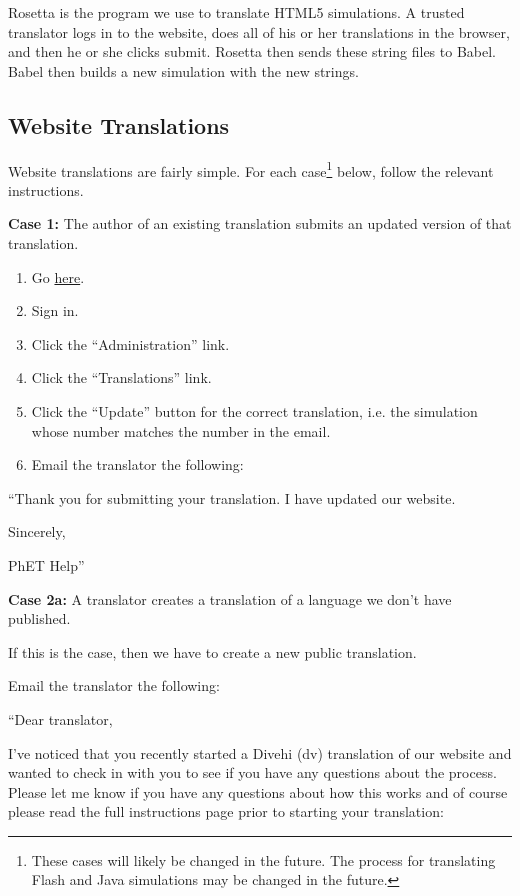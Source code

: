 \documentclass[titlepage]{article}
\begin{document}
Rosetta is the program we use to translate HTML5 simulations. A trusted translator logs in to the website, does all of his or her translations in the browser, and then he or she clicks submit. Rosetta then sends these string files to Babel. Babel then builds a new simulation with the new strings.

	\subsection{Website Translations}

Website translations are fairly simple. For each case\footnote{These cases will likely be changed in the future. The process for translating Flash and Java simulations may be changed in the future.} below, follow the relevant instructions.

\textbf{Case 1:}
The author of an existing translation submits an updated version of that translation.	
		\begin{enumerate}
			\item Go \href{https://phet.colorado.edu/}{here}.
			\item Sign in.
			\item Click the ``Administration'' link.
			\item Click the ``Translations'' link.
			\item Click the ``Update'' button for the correct translation, i.e. the simulation whose number matches the number in the email.
			\item Email the translator the following:
		\end{enumerate}

``Thank you for submitting your translation. I have updated our website.

Sincerely,

PhET Help''

\textbf{Case 2a:}
A translator creates a translation of a language we don't have published.

If this is the case, then we have to create a new public translation.

Email the translator the following:

``Dear translator,

I've noticed that you recently started a Divehi (dv) translation of our website and wanted to check in with you to see if you have any questions about the process.  Please let me know if you have any questions about how this works and of course please read the full instructions page prior to starting your translation:
\end{document}
